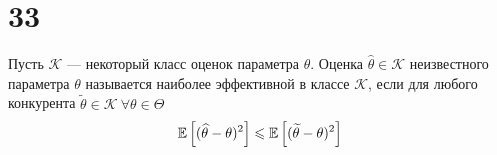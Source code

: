 \documentclass{article}
\begin{document}
\section*{33}
 Пусть $\mathcal{K}$ — некоторый класс оценок параметра $\theta$. Оценка $\widehat{\theta}\in\mathcal{K}$ неизвестного параметра $\theta$ называется наиболее эффективной в классе $\mathcal{K}$, если для любого конкурента $\widetilde{\theta}\in\mathcal{K}\ \forall \theta\in\Theta$
\begin{equation*}
    \begin{aligned}
        \mathbb{E}\left[(\widehat{\theta}-\theta)^2\right]\leqslant\mathbb{E}\left[(\widetilde{\theta}-\theta)^2\right]
    \end{aligned}
\end{equation*}
\end{document}
